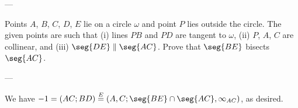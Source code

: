
---

Points $A$, $B$, $C$, $D$, $E$ lie on a circle $\omega$ and point $P$ lies outside the circle. The given points are such that (i) lines $PB$ and $PD$ are tangent to $\omega$, (ii) $P$, $A$, $C$ are collinear, and (iii) $\seg{DE}\parallel\seg{AC}$. Prove that $\seg{BE}$ bisects $\seg{AC}$.

---

We have $-1=(AC;BD)\stackrel E=(A,C;\seg{BE}\cap\seg{AC},\infty_{AC})$, as desired.
